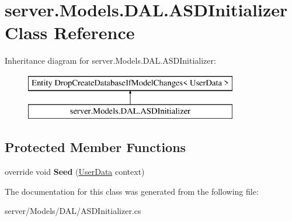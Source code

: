 \hypertarget{classserver_1_1Models_1_1DAL_1_1ASDInitializer}{\section{server.\-Models.\-D\-A\-L.\-A\-S\-D\-Initializer Class Reference}
\label{classserver_1_1Models_1_1DAL_1_1ASDInitializer}
}
Inheritance diagram for server.\-Models.\-D\-A\-L.\-A\-S\-D\-Initializer\-:\begin{figure}[H]
\begin{center}
\leavevmode
\includegraphics[height=2.000000cm]{classserver_1_1Models_1_1DAL_1_1ASDInitializer}
\end{center}
\end{figure}
\subsection*{Protected Member Functions}
\begin{DoxyCompactItemize}
\item 
\hypertarget{classserver_1_1Models_1_1DAL_1_1ASDInitializer_afd9f60e98d02493a855949dfc8cc7cee}{override void {\bfseries Seed} (\hyperlink{classserver_1_1Models_1_1DAL_1_1UserData}{User\-Data} context)}\label{classserver_1_1Models_1_1DAL_1_1ASDInitializer_afd9f60e98d02493a855949dfc8cc7cee}

\end{DoxyCompactItemize}


The documentation for this class was generated from the following file\-:\begin{DoxyCompactItemize}
\item 
server/\-Models/\-D\-A\-L/A\-S\-D\-Initializer.\-cs\end{DoxyCompactItemize}
